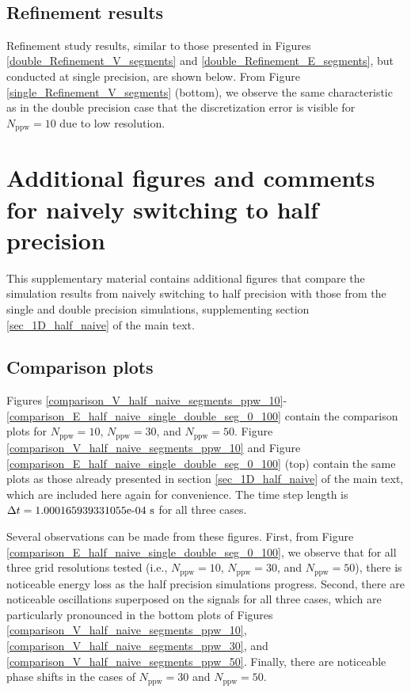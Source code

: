 \ \newline


\subsection{Refinement results}\label{SM_single_refinement}
Refinement study results, similar to those presented in Figures \ref{double_Refinement_V_segments} and \ref{double_Refinement_E_segments}, but conducted at single precision, are shown below. 
%
From Figure \ref{single_Refinement_V_segments} (bottom), we observe the same characteristic as in the double precision case that the discretization error is visible for $N_\text{ppw} = 10$ due to low resolution.
%



\newpage
\section{Additional figures and comments for naively switching to half precision}\label{SM_half_naive}
%
This supplementary material contains additional figures that compare the simulation results from naively switching to half precision with those from the single and double precision simulations, supplementing section \ref{sec_1D_half_naive} of the main text.


\subsection{Comparison plots}\label{SM_half_naive_plots}
%
Figures \ref{comparison_V_half_naive_segments_ppw_10}-\ref{comparison_E_half_naive_single_double_seg_0_100} contain the comparison plots for $N_\text{ppw}=10$, $N_\text{ppw}=30$, and $N_\text{ppw}=50$.
%
Figure \ref{comparison_V_half_naive_segments_ppw_10} and Figure \ref{comparison_E_half_naive_single_double_seg_0_100} (top) contain the same plots as those already presented in section \ref{sec_1D_half_naive} of the main text, which are included here again for convenience.
%
The time step length is $\Delta t = \text{\rm1.000165939331055e-04 s}$ for all three cases.


Several observations can be made from these figures.
%
First, from Figure \ref{comparison_E_half_naive_single_double_seg_0_100}, we observe that for all three grid resolutions tested (i.e., $N_\text{ppw} = 10$, $N_\text{ppw} = 30$, and $N_\text{ppw} = 50$), there is noticeable energy loss as the half precision simulations progress.
%
Second, there are noticeable oscillations superposed on the signals for all three cases, which are particularly pronounced in the bottom plots of Figures \ref{comparison_V_half_naive_segments_ppw_10}, \ref{comparison_V_half_naive_segments_ppw_30}, and \ref{comparison_V_half_naive_segments_ppw_50}.
%
Finally, there are noticeable phase shifts in the cases of $N_\text{ppw}=30$ and $N_\text{ppw}=50$.


